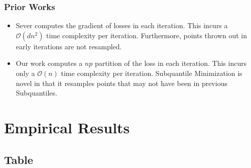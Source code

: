\documentclass[
11pt, %
serif
]{beamer}
\begin{document}
	\begin{frame}
		\frametitle{Prior Works }
		\begin{itemize}
			\item[\ding{228}]
			\cite{DiakonikolasKKLSS19} Sever computes the gradient of losses in each iteration. This incurs a $\mathcal{O}(dn^2)$ time complexity per iteration. Furthermore, points thrown out in early iterations are not resampled. 
			\item[\ding{228}] 
			Our work computes a $np$ partition of the loss in each iteration. This incurs only a $\mathcal{O}(n)$ time complexity per iteration. Subquantile Minimization is novel in that it resamples points that may not have been in previous Subquantiles.
		\end{itemize}
		
	\end{frame}
	
	
	
	\section{Empirical Results}
	
	\subsection{Table}
	
\end{document}
